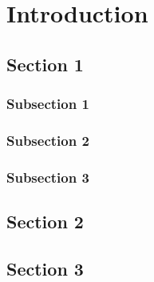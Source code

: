 \doublespacing

\chapter{Introduction}

\section{Section 1}
\subsection{Subsection 1}
\subsection{Subsection 2}
\subsection{Subsection 3}
\section{Section 2}
\section{Section 3}
